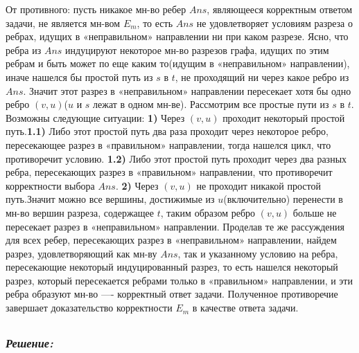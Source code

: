 \documentclass[a4paper, 12pt]{article}
\newcommand*\circled[1]{\tikz[baseline=(char.base)]{
            \node[shape=circle,draw,inner sep=2pt] (char) {#1};}}
\begin{document}
От противного: пусть никакое мн-во ребер $Ans$, являющееся корректным ответом задачи, не является мн-вом $E_m$, то есть $Ans$ не удовлетворяет условиям разреза о ребрах, идущих в «неправильном» направлении ни при каком разрезе. Ясно, что ребра из $Ans$ индуцируют некоторое мн-во разрезов графа, идущих по этим ребрам и быть может по еще каким то(идущим в «неправильном» направлении), иначе нашелся бы простой путь из $s$ в $t$, не проходящий ни через какое ребро из $Ans$. Значит этот разрез в «неправильном» направлении пересекает хотя бы одно ребро $(v, u)$($u$ и $s$ лежат в одном мн-ве). Рассмотрим все простые пути из $s$ в $t$. Возможны следующие ситуации: \newline\newline\textbf{1)} Через $(v, u)$ проходит некоторый простой путь.\newline\newline \textbf{1.1)} Либо этот простой путь два раза проходит через некоторое ребро, пересекающее разрез в «правильном» направлении, тогда нашелся цикл, что противоречит условию.\newline\newline 
\textbf{1.2)} Либо этот простой путь проходит через два разных ребра, пересекающих разрез в «правильном» направлении, что противоречит корректности выбора $Ans$. \newline\newline\textbf{2)} Через $(v, u)$ не проходит никакой простой путь.\newline\newline Значит можно все вершины, достижимые из $u$(включительно) перенести в мн-во вершин разреза, содержащее $t$, таким образом ребро $(v, u)$ больше не пересекает разрез в «неправильном» направлении. Проделав те же рассуждения для всех ребер, пересекающих разрез в «неправильном» направлении, найдем разрез, удовлетворяющий как мн-ву $Ans$, так и указанному условию на ребра, пересекающие некоторый индуцированный разрез, то есть нашелся некоторый разрез, который пересекается ребрами только в «правильном» направлении, и эти ребра образуют мн-во —- корректный ответ задачи. Полученное противоречие завершает доказательство корректности $E_m$ в качестве ответа задачи.

\subsection*{\circled{5}} 
\subsubsection*{\textit{Решение:}}
\end{document}

